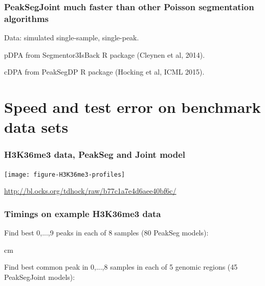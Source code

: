 \documentclass{beamer}
\begin{document}
\begin{frame}
  \frametitle{PeakSegJoint much faster than other Poisson
    segmentation algorithms}

  Data: simulated single-sample, single-peak.

   

  pDPA from Segmentor3IsBack R package (Cleynen et al, 2014).

  cDPA from PeakSegDP R package (Hocking et al, ICML 2015).

\end{frame}

\section{Speed and test error on benchmark data sets}

\begin{frame}
  \frametitle{H3K36me3 data, PeakSeg and Joint model}

  \texttt{[image: figure-H3K36me3-profiles]}

  \url{http://bl.ocks.org/tdhock/raw/b77c1a7e4d6aee40bf6c/}
\end{frame}

\begin{frame}
  \frametitle{Timings on example H3K36me3 data}

  \small

  Find best 0,...,9 peaks in each of 8 samples (80 PeakSeg
  models):

  \scriptsize

  

   cm

  \small

  Find best common peak in 0,...,8 samples in each of 5 genomic
  regions (45 PeakSegJoint models):

  \scriptsize

  

\end{frame}
\end{document}
